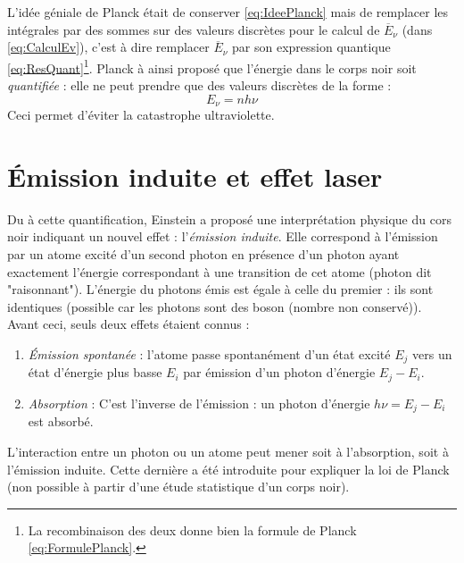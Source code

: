 \documentclass[british,french,11pt, a4paper, openany]{book}
\begin{document}
L'idée géniale de Planck était de conserver \autoref{eq:IdeePlanck} mais de remplacer les intégrales par
des sommes sur des valeurs discrètes pour le calcul de $\overline{E}_\nu$ (dans \autoref{eq:CalculEv}), 
c'est à dire remplacer $\overline{E}_\nu$ par son expression quantique \autoref{eq:ResQuant}\footnote{La 
	recombinaison des deux donne bien la formule de Planck \autoref{eq:FormulePlanck}.}. Planck à ainsi proposé 
que l'énergie dans le corps noir soit \textit{quantifiée} : elle ne peut prendre que des valeurs discrètes 
de la forme :
\begin{equation}
	E_\nu = nh\nu
\end{equation}
Ceci permet d'éviter la catastrophe ultraviolette.


\section{Émission induite et effet laser}
Du à cette quantification, Einstein a proposé une interprétation physique du cors noir indiquant un nouvel 
effet : l'\textit{émission induite}. Elle correspond à l'émission par un atome excité d'un second photon en 
présence d'un photon ayant exactement l'énergie correspondant à une transition de cet atome (photon dit 
"raisonnant"). L'énergie du photons émis est égale à celle du premier : ils sont identiques (possible car les
photons sont des boson (nombre non conservé)). Avant ceci, seuls deux effets étaient connus :
\begin{enumerate}
	\item \textit{Émission spontanée} : l'atome passe spontanément d'un état excité $E_j$ vers un état d'énergie
	plus basse $E_i$ par émission d'un photon d'énergie $E_j-E_i$.
	\item \textit{Absorption} : C'est l'inverse de l'émission : un photon d'énergie $h\nu = E_j-E_i$ est 
	absorbé.
\end{enumerate}
L'interaction entre un photon ou un atome peut mener soit à l'absorption, soit à l'émission induite. Cette 
dernière a été introduite pour expliquer la loi de Planck (non possible à partir d'une étude statistique d'un
corps noir).
\end{document}
